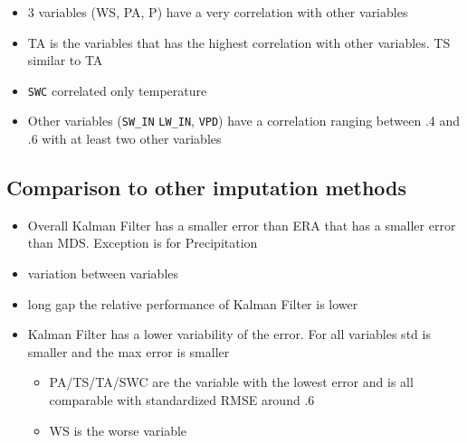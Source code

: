 \documentclass{article}
\let\Oldsubsection\subsection
\renewcommand{\subsection}{\FloatBarrier\Oldsubsection}
\begin{document}
\begin{itemize}
    \item 3 variables (WS, PA, P) have a very correlation with other variables
    \item TA is the variables that has the highest correlation with other variables. TS similar to TA
    \item \texttt{SWC} correlated only temperature
    \item Other variables (\texttt{SW\_IN} \texttt{LW\_IN}, \texttt{VPD}) have a correlation ranging between .4 and .6 with at least two other variables
\end{itemize}



\subsection{Comparison to other imputation methods}

\begin{itemize}
    \item Overall Kalman Filter has a smaller error than ERA that has a smaller error than MDS. Exception is for Precipitation
    \item variation between variables
    \item long gap the relative performance of Kalman Filter is lower
    \item Kalman Filter has a lower variability of the error. For all variables std is smaller and the max error is smaller
    \begin{itemize}
    \item PA/TS/TA/SWC are the variable with the lowest error and is all comparable with standardized RMSE around .6
    \item WS is the worse variable
\end{itemize}
\end{itemize}
\end{document}
